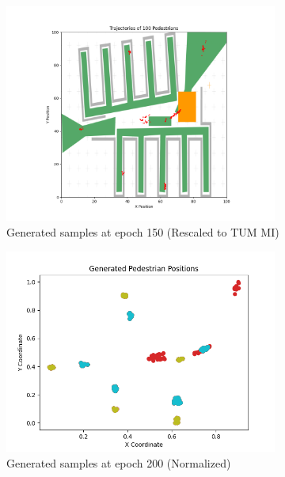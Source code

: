 \documentclass[10pt,a4paper]{article}
\begin{document}
\begin{figure}[H]
    \centering
    \includegraphics[width=0.8\textwidth]{Images/pedestrians_trajectories_epoch150.png}
    \caption{Generated samples at epoch 150 (Rescaled to TUM MI)}
    \label{fig:epoch150_real}
\end{figure}

\begin{figure}[H]
    \centering
    \includegraphics[width=0.8\textwidth]{Images/nomalized_epoch200.png}
    \caption{Generated samples at epoch 200 (Normalized)}
    \label{fig:epoch200_norm}
\end{figure}
\end{document}
